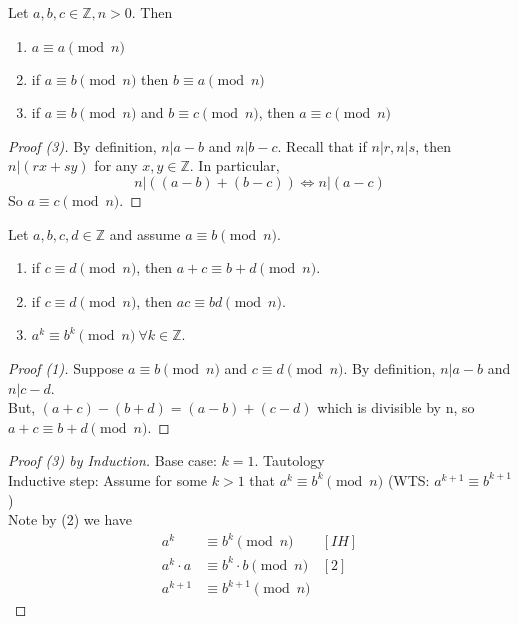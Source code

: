     \begin{theorem}
        Let $a,b,c\in\mathbb{Z}, n>0$. Then
        \begin{enumerate}
            \item $a\equiv a \pmod{n}$
            \item if $a\equiv b \pmod{n}$ then $b\equiv a \pmod{n}$
            \item if $a\equiv b \pmod{n}$ and $b\equiv c \pmod{n}$, then
            $a\equiv c \pmod{n}$
        \end{enumerate}
        \begin{proof} [Proof (3)]
            By definition, $n|a-b$ and $n|b-c$. Recall that if $n|r, n|s$, 
            then $n|(rx+sy)$ for any $x,y\in\mathbb{Z}$. In particular,
            \[
                n|((a-b)+(b-c)) \Leftrightarrow n|(a-c)
            \]
            So $a\equiv c \pmod{n}$.
        \end{proof}
    \end{theorem}

    \begin{theorem}
        Let $a,b,c,d\in\mathbb{Z}$ and assume $a\equiv b \pmod{n}$.
        \begin{enumerate}
            \item if $c\equiv d \pmod{n}$, then $a+c\equiv b+d\pmod{n}$.
            \item if $c\equiv d \pmod{n}$, then $ac\equiv bd \pmod{n}$.
            \item $a^k\equiv b^k \pmod{n}\ \forall k\in\mathbb{Z}$.
        \end{enumerate}
        \begin{proof} [Proof (1)]
            Suppose $a\equiv b \pmod{n}$ and $c\equiv d \pmod{n}$. By definition,
            $n|a-b$ and $n|c-d$. \\
            But, $(a+c)-(b+d)=(a-b)+(c-d)$ which is divisible by n, so 
            $a+c\equiv b+d \pmod{n}$.
        \end{proof}
        \begin{proof} [Proof (3) by Induction]
            Base case: $k=1$. Tautology \\
            Inductive step: Assume for some $k>1$ that $a^k\equiv b^k \pmod{n}$
            (WTS: $a^{k+1}\equiv b^{k+1}$) \\
            Note by (2) we have 
            \begin{align*}
                a^k & \equiv b^k \pmod{n} & [IH]\\
                a^k\cdot a & \equiv b^k\cdot b \pmod{n} & [2]\\
                a^{k+1} & \equiv b^{k+1} \pmod{n}
            \end{align*}
        \end{proof}

    \end{theorem}
    
